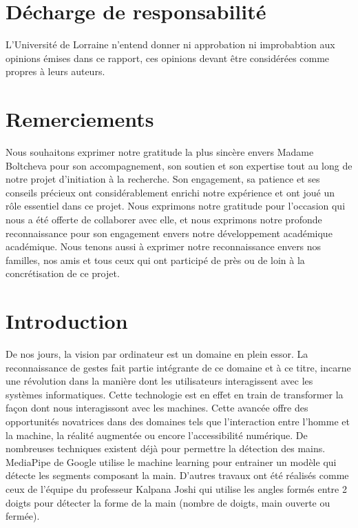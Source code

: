 \documentclass[11pt]{article}
\begin{document}
\newpage \newpage
\section*{Décharge de responsabilité }\bigbreak
L'Université de Lorraine n'entend donner ni approbation  ni improbabtion aux opinions émises dans ce rapport,
ces opinions devant être considérées comme propres à leurs auteurs. \bigbreak

\newpage
\section*{Remerciements}
Nous souhaitons exprimer notre gratitude la plus sincère envers Madame Boltcheva pour son accompagnement, son soutien et son expertise tout au long de notre projet d'initiation à la recherche. Son engagement, sa patience et ses conseils précieux ont considérablement enrichi notre expérience et ont joué un rôle essentiel dans ce projet. Nous exprimons notre gratitude pour l'occasion qui nous a été offerte de collaborer avec elle, et nous exprimons notre profonde reconnaissance pour son engagement envers notre développement académique académique. Nous tenons aussi à exprimer notre reconnaissance envers nos familles, nos amis et tous ceux qui ont participé de près ou de loin à la concrétisation de ce projet. 

\newpage
\tableofcontents
\newpage

\setcounter{page}{1}
\section*{Introduction}
De nos jours, la vision par ordinateur est un domaine en plein essor. La reconnaissance de gestes fait partie intégrante de ce domaine et à ce titre, incarne une révolution dans la manière dont les utilisateurs interagissent avec les systèmes informatiques. Cette technologie est en effet en train de transformer la façon dont nous interagissont avec les machines. Cette avancée offre des opportunités novatrices dans des domaines tels que l'interaction entre l'homme et la machine,
la réalité augmentée ou encore l'accessibilité numérique.
De nombreuses techniques existent déjà pour permettre la détection des mains. MediaPipe de Google \cite{mediapipe} utilise le machine learning pour entrainer un modèle qui détecte les segments composant la main. D'autres travaux ont été réalisés comme ceux de l'équipe du professeur Kalpana Joshi \cite{joshi_static_2021} qui utilise les angles formés entre 2 doigts pour détecter la forme de la main (nombre de doigts, main ouverte ou fermée).\bigbreak
\end{document}
